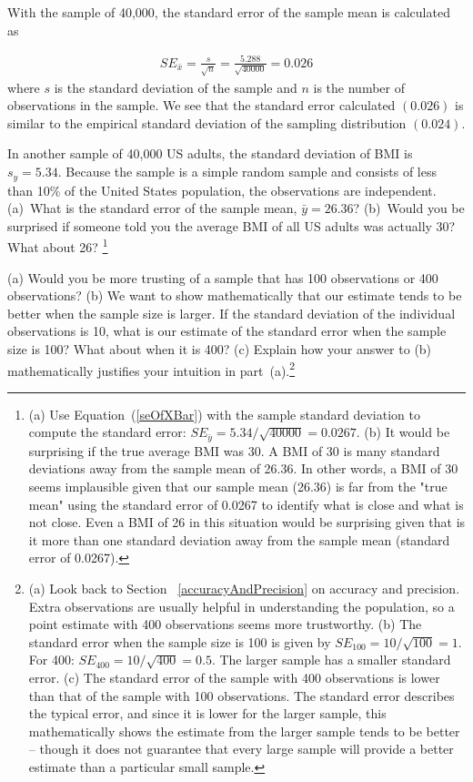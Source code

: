 With the  sample of 40,000, the standard error of the sample mean is calculated as

\begin{eqnarray*}
SE_{\bar{x}} = \frac{s}{\sqrt{n}} = \frac{5.288}{\sqrt{40000}} =  0.026
\end{eqnarray*}
where $s$ is the standard deviation of the sample and $n$ is the number of observations in the sample. We see that the standard error calculated $(0.026)$ is similar to the empirical standard deviation of the sampling distribution $(0.024)$. 

\begin{exercise}
In another sample of 40,000 US adults, the standard deviation of BMI is $s_y = 5.34$. Because the sample is a simple random sample and consists of less than 10\% of the United States population, the observations are independent. (a)~What is the standard error of the sample mean, $\bar{y}=26.36$? (b)~Would you be surprised if someone told you the average BMI of all US adults was actually 30? What about 26? \footnote{(a) Use Equation~(\ref{seOfXBar}) with the sample standard deviation to compute the standard error: $SE_{\bar{y}} = 5.34/\sqrt{40000} =  0.0267$. (b) It would be surprising if the true average BMI was 30. A BMI of 30 is many standard deviations away from the sample mean of 26.36. In other words, a BMI of 30 seems implausible given that our sample mean (26.36) is far from the "true mean" using the standard error of 0.0267 to identify what is close and what is not close. Even a BMI of 26 in this situation would be surprising given that is it more than one standard deviation away from the sample mean (standard error of 0.0267).}
\end{exercise}


\begin{exercise}
(a) Would you be more trusting of a sample that has 100 observations or 400 observations? (b) We want to show mathematically that our estimate tends to be better when the sample size is larger. If the standard deviation of the individual observations is 10, what is our estimate of the standard error when the sample size is 100? What about when it is 400? (c) Explain how your answer to (b) mathematically justifies your intuition in part~(a).\footnote{(a) Look back to Section ~\ref{accuracyAndPrecision} on accuracy and precision. Extra observations are usually helpful in understanding the population, so a point estimate with 400 observations seems more trustworthy. (b) The standard error when the sample size is 100 is given by $SE_{100} = 10/\sqrt{100} = 1$. For 400: $SE_{400} = 10/\sqrt{400} = 0.5$. The larger sample has a smaller standard error. (c) The standard error of the sample with 400 observations is lower than that of the sample with 100 observations. The standard error describes the typical error, and since it is lower for the larger sample, this mathematically shows the estimate from the larger sample tends to be better -- though it does not guarantee that every large sample will provide a better estimate than a particular small sample.}
\end{exercise}

